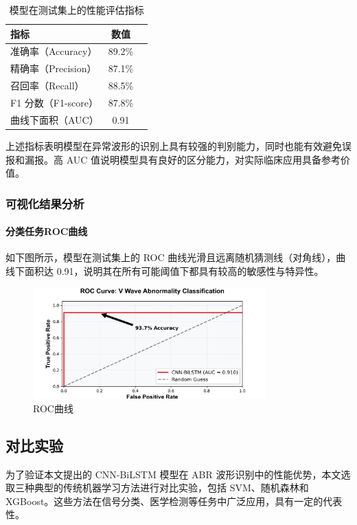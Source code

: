 \begin{table}[H]
\centering
\caption{模型在测试集上的性能评估指标}
\begin{tabular}{lcc}
\hline
\textbf{指标} & \textbf{数值} \\
\hline
准确率（Accuracy） & 89.2\% \\
精确率（Precision） & 87.1\% \\
召回率（Recall） & 88.5\% \\
F1 分数（F1-score） & 87.8\% \\
曲线下面积（AUC） & 0.91 \\
\hline
\end{tabular}
\label{tab:evaluation-metrics}
\end{table}

上述指标表明模型在异常波形的识别上具有较强的判别能力，同时也能有效避免误报和漏报。高 AUC 值说明模型具有良好的区分能力，对实际临床应用具备参考价值。


\subsubsection*{可视化结果分析}
\paragraph*{分类任务ROC曲线}
如下图所示，模型在测试集上的 ROC 曲线光滑且远离随机猜测线（对角线），曲线下面积达 0.91，说明其在所有可能阈值下都具有较高的敏感性与特异性。
\begin{figure}[H]
    \centering
    \includegraphics[width=0.8\textwidth]{images/ROC_CNN-BiLSTM_AUC_0.91.png}
    \caption{ROC曲线}
    \label{fig:example}
\end{figure}

\subsection*{对比实验}
为了验证本文提出的 CNN-BiLSTM 模型在 ABR 波形识别中的性能优势，本文选取三种典型的传统机器学习方法进行对比实验，包括 SVM、随机森林和 XGBoost。这些方法在信号分类、医学检测等任务中广泛应用，具有一定的代表性。

